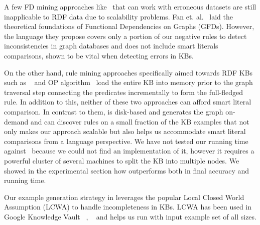 A few FD mining approaches like~\cite{abedjan2015temporal,kivinen1995approximate} that can work with erroneous datasets are still inapplicable to RDF data due to scalability problems.
Fan et. al.~\cite{FanFDGraphs} laid the theoretical foundations of Functional Dependencies on Graphs (GFDs). 
However, the language they propose covers only a portion of our negative rules to detect inconsistencies in graph databases and does not include smart literals comparisons, 
shown to be vital when detecting errors in KBs.

On the other hand, rule mining approaches specifically aimed towards RDF KBs such as \amie~\cite{galarraga2015fast} and OP algorithm~\cite{Chen:2016} load the entire KB into memory prior to 
the graph traversal step connecting the predicates incrementally to form the full-fledged rule. In addition to this, neither of these two approaches can afford smart literal comparison. 
In contrast to them, \krd is disk-based and generates the graph on-demand and can discover rules on a small fraction of the KB examples that not only makes our approach scalable but also helps us 
accommodate smart literal comparisons from a language perspective. 
We have not tested our running time against~\cite{Chen:2016} because we could not find an implementation of it, 
however it requires a powerful cluster of several machines to split the KB into multiple nodes. 
We showed in the experimental section how \krd outperforms \amie both in final accuracy and running time.

Our example generation strategy in \krd leverages the popular Local Closed World Assumption (LCWA) to handle incompleteness in KBs. LCWA has been used in Google Knowledge Vault
~\cite{dong2014data,dong2014knowledge,dong2015knowledge}, \amie~\cite{galarraga2015fast} and helps us run with input example set of all sizes.

